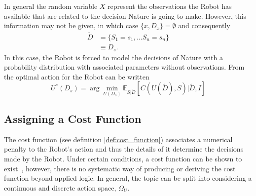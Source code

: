 \begin{example}
	In general the random variable $X$ represent the observations the Robot has available that are related to the decision Nature is going to make. However, this information may not be given, in which case $\{x,D_x\}=\emptyset$ and consequently
	\begin{equation}
		\begin{split}
			\tilde{D} &= \{S_1 =s_1,\dots S_n=s_n\}\\
			&\equiv D_s.
		\end{split}
	\end{equation}
	In this case, the Robot is forced to model the decisions of Nature with a probability distribution with associated parameters without observations. From  the optimal action for the Robot can be written
	\begin{equation}
		U^*(D_s) = \arg\min_{U(D_s)} \mathbb{E}_{S|\tilde{D}}[C(U(\tilde{D}), S)|\tilde{D},I]
		\label{eq:best_decision1}
	\end{equation}
\end{example}

\subsection{Assigning a Cost Function}
\label{sec:assing_cost}
The cost function (see definition \ref{def:cost_function}) associates a numerical penalty to the Robot's action and thus the details of it determine the decisions made by the Robot. Under certain conditions, a cost function can be shown to exist~\citep{lavalle2006planning}, however, there is no systematic way of producing or deriving the cost function beyond applied logic. In general, the topic can be split into considering a continuous and discrete action space, $\Omega_U$. 	

